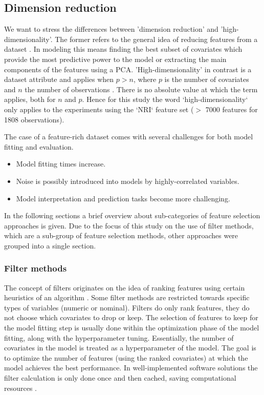 \documentclass[letterpaper, peerreview]{IEEEtran}
\begin{document}
\subsection{Dimension reduction}

\noindent We want to stress the differences between 'dimension reduction' and 'high-dimensionality'.
The former refers to the general idea of reducing features from a dataset \cite{vandermaaten2007}.
In modeling this means finding the best subset of covariates which provide the most predictive power to the model or extracting the main components of the features using a \ac{PCA}.
'High-dimensionality' in contrast is a dataset attribute and applies when \(p > n\), where \(p\) is the number of covariates and \(n\) the number of observations \cite{hastie2001}.
There is no absolute value at which the term applies, both for \(n\) and \(p\).
Hence for this study the word ‘high-dimensionality‘ only applies to the experiments using the ‘NRI‘ feature set ($>$ 7000 features for 1808 observations).

The case of a feature-rich dataset comes with several challenges for both model fitting and evaluation.

\begin{itemize}
	\item Model fitting times increase.
	\item Noise is possibly introduced into models by highly-correlated variables\cite{johnstoneiainm.2009}.
	\item Model interpretation and prediction tasks become more challenging\cite{johnstoneiainm.2009}.
\end{itemize}

\noindent In the following sections a brief overview about sub-categories of feature selection approaches is given.
Due to the focus of this study on the use of filter methods, which are a sub-group of feature selection methods, other approaches were grouped into a single section.

\subsubsection{Filter methods}

\noindent The concept of filters originates on the idea of ranking features using certain heuristics of an algorithm \cite{chandrashekar2014}.
Some filter methods are restricted towards specific types of variables (numeric or nominal).
Filters do only rank features, they do not choose which covariates to drop or keep\cite{drotar2015}.
The selection of features to keep for the model fitting step is usually done within the optimization phase of the model fitting, along with the hyperparameter tuning.
Essentially, the number of covariates in the model is treated as a hyperparameter of the model.
The goal is to optimize the number of features (using the ranked covariates) at which the model achieves the best performance.
In well-implemented software solutions the filter calculation is only done once and then cached, saving computational resources \cite{mlr}.
\end{document}
